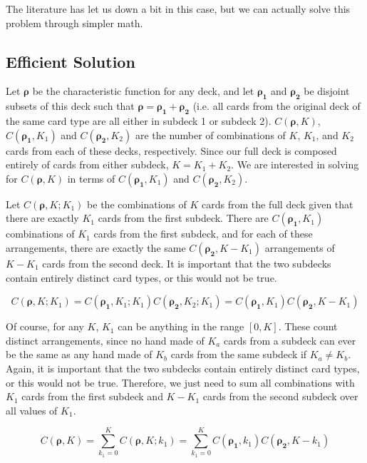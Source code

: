 \documentclass{article}
\begin{document}
The literature has let us down a bit in this case, but we can actually solve this problem through simpler math.

\subsection{Efficient Solution}

Let $\bm{\rho}$ be the characteristic function for any deck, and let $\bm{\rho_1}$ and $\bm{\rho_2}$ be disjoint subsets of this deck such that $\bm{\rho} = \bm{\rho_1} + \bm{\rho_2}$ (i.e. all cards from the original deck of the same card type are all either in subdeck 1 or subdeck 2). $C(\bm{\rho}, K)$, $C(\bm{\rho_1}, K_1)$ and $C(\bm{\rho_2}, K_2)$ are the number of combinations of $K$, $K_1$, and $K_2$ cards from each of these decks, respectively. Since our full deck is composed entirely of cards from either subdeck, $K = K_1 + K_2$. We are interested in solving for $C(\bm{\rho}, K)$ in terms of $C(\bm{\rho_1}, K_1)$ and $C(\bm{\rho_2}, K_2)$. 

Let $C(\bm{\rho}, K; K_1)$ be the combinations of $K$ cards from the full deck given that there are exactly $K_1$ cards from the first subdeck. There are $C(\bm{\rho_1}, K_1)$ combinations of $K_1$ cards from the first subdeck, and for each of these arrangements, there are exactly the same $C(\bm{\rho_2}, K - K_1)$ arrangements of $K - K_1$ cards from the second deck. It is important that the two subdecks contain entirely distinct card types, or this would not be true.

\begin{equation}
    C(\bm{\rho}, K; K_1) = C(\bm{\rho_1}, K_1 ; K_1) C(\bm{\rho_2}, K_2; K_1)= C(\bm{\rho_1}, K_1) C(\bm{\rho_2}, K - K_1)
\end{equation}

Of course, for any $K$, $K_1$ can be anything in the range $[0, K]$. These count distinct arrangements, since no hand made of $K_a$ cards from a subdeck can ever be the same as any hand made of $K_b$ cards from the same subdeck if $K_a \ne K_b$. Again, it is important that the two subdecks contain entirely distinct card types, or this would not be true. Therefore, we just need to sum all combinations with $K_1$ cards from the first subdeck and $K - K_1$ cards from the second subdeck over all values of $K_1$.

\begin{equation}
    C(\bm{\rho}, K) = \sum_{k_1=0}^K C(\bm{\rho}, K; k_1) = \sum_{k_1=0}^K C(\bm{\rho_1}, k_1) C(\bm{\rho_2}, K - k_1)
\end{equation}
\end{document}
